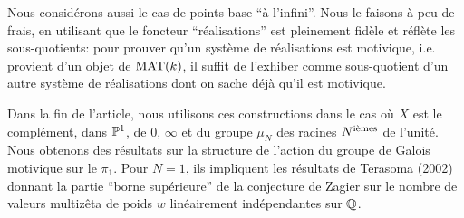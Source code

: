 Nous consid\'erons aussi le cas de points base
``\`a l'infini''.
Nous le faisons \`a peu de frais, en utilisant
que le foncteur ``r\'ealisations'' est
pleinement fid\`ele et r\'efl\`ete les
sous-quotients: pour prouver qu'un syst\`eme
de r\'ealisations est motivique, i.e. provient
d'un objet de $\text{\rm MAT}(k)$, il suffit de
l'exhiber comme sous-quotient d'un autre
syst\`eme de r\'ealisations dont on sache
d\'ej\`a qu'il est motivique. 

Dans la fin de l'article, nous utilisons ces
constructions dans le cas o\`u $X$ est le
compl\'ement, dans ${\Bbb P}^1$, de $0$, $\infty$ et
du groupe $\mu_N$ des racines $N^{\text{\rm i\`emes}}$ de
l'unit\'e.
Nous obtenons des r\'esultats sur la
structure de l'action 
du groupe de  Galois motivique sur le $\pi_1$.
Pour $N=1$, ils impliquent les r\'esultats de
Terasoma (2002) donnant la partie ``borne
sup\'erieure'' de la conjecture de Zagier sur
le nombre de valeurs multiz\^{e}ta de poids
$w$ lin\'eairement ind\'ependantes sur
${\Bbb Q}$.





